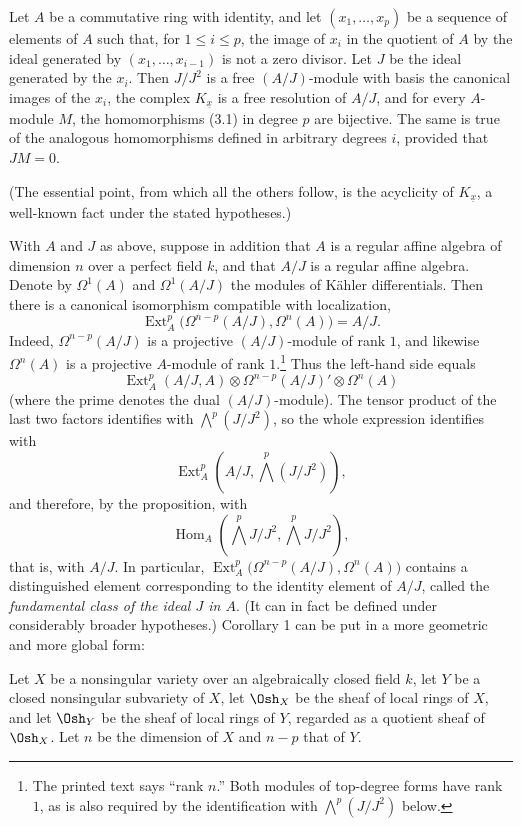  Let $A$ be a commutative ring with identity, and let
$(x_1,\ldots,x_p)$ be a sequence of elements of $A$ such that, for
$1\leq i\leq p$, the image of $x_i$ in the quotient of $A$ by the ideal
generated by $(x_1,\ldots,x_{i-1})$ is not a zero divisor. Let $J$ be the ideal
generated by the $x_i$. Then $J/J^{2}$ is a free $(A/J)$-module with basis the
canonical images of the $x_i$, the complex $K_{\underline{x}}$ is a free
resolution of $A/J$, and for every $A$-module $M$, the homomorphisms (3.1) in
degree $p$ are bijective. The same is true of the analogous homomorphisms
defined in arbitrary degrees $i$, provided that $J M=0$.

(The essential point, from which all the others follow, is the acyclicity of
$K_{\underline{x}}$, a well-known fact under the stated hypotheses.)

 With $A$ and $J$ as above, suppose in addition that $A$
is a regular affine algebra of dimension $n$ over a perfect field $k$, and that
$A/J$ is a regular affine algebra. Denote by $\Omega^{1}(A)$ and
$\Omega^{1}(A/J)$ the modules of Kähler differentials. Then there is a canonical
isomorphism compatible with localization,
\begin{equation}\tag{3.5}
  \operatorname{Ext}_{A}^{p}\bigl(\Omega^{n-p}(A/J),\Omega^{n}(A)\bigr)=A/J.
\end{equation}
Indeed, $\Omega^{n-p}(A/J)$ is a projective $(A/J)$-module of rank $1$, and likewise
$\Omega^{n}(A)$ is a projective $A$-module of rank $1$.\footnote{The printed text says
“rank $n$.” Both modules of top-degree forms have rank $1$, as is also required
by the identification with $\bigwedge^{p}(J/J^{2})$ below.} Thus the left-hand
side equals
\[
  \operatorname{Ext}_{A}^{p}(A/J,A)
  \otimes\Omega^{n-p}(A/J)'\otimes\Omega^{n}(A)
\]
(where the prime denotes the dual $(A/J)$-module). The tensor product of the
last two factors identifies with $\bigwedge^{p}(J/J^{2})$, so the whole expression
identifies with
\[
  \operatorname{Ext}_{A}^{p}\!\left(A/J,\bigwedge^{p}(J/J^{2})\right),
\]
and therefore, by the proposition, with
\[
  \operatorname{Hom}_{A}\!\left(\bigwedge^{p}J/J^{2},
  \bigwedge^{p}J/J^{2}\right),
\]
that is, with $A/J$. In particular,
$\operatorname{Ext}_{A}^{p}\bigl(\Omega^{n-p}(A/J),\Omega^{n}(A)\bigr)$ contains
a distinguished element corresponding to the identity element of $A/J$, called
the \emph{fundamental class of the ideal $J$ in $A$}. (It can in fact be defined
under considerably broader hypotheses.) Corollary 1 can be put in a more
geometric and more global form:

 Let $X$ be a nonsingular variety over an algebraically
closed field $k$, let $Y$ be a closed nonsingular subvariety of $X$, let
$\Osh_X$ be the sheaf of local rings of $X$, and let $\Osh_Y$ be the sheaf of
local rings of $Y$, regarded as a quotient sheaf of $\Osh_X$. Let $n$ be the
dimension of $X$ and $n-p$ that of $Y$.


